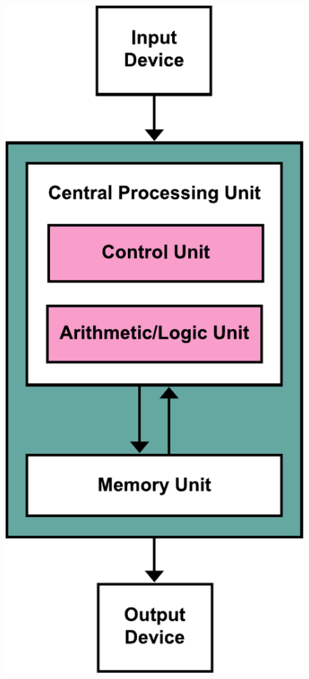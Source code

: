 \begin{frame}
\begin{columns}
		\begin{figure}[!htbp]
			\centering 
			\includegraphics[width=0.90\linewidth]{images/3_architetture/architecture_von_neumann.pdf}
		\end{figure}
	\end{columns}
	
	
\end{frame}


